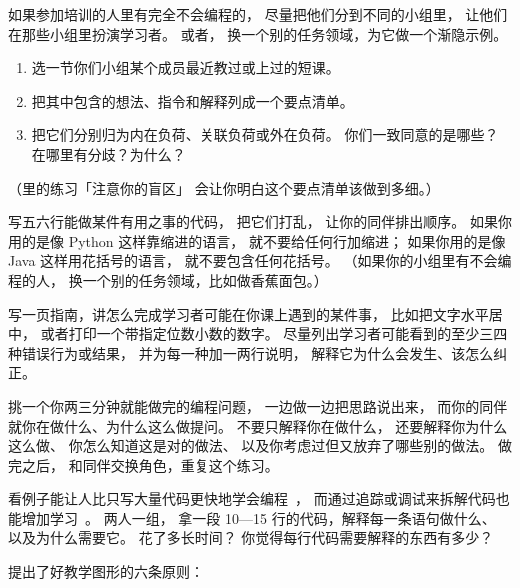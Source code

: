 如果参加培训的人里有完全不会编程的，
尽量把他们分到不同的小组里，
让他们在那些小组里扮演学习者。
或者，
换一个别的任务领域，为它做一个渐隐示例。


\begin{enumerate}

\item
  选一节你们小组某个成员最近教过或上过的短课。

\item
  把其中包含的想法、指令和解释列成一个要点清单。

\item
  把它们分别归为内在负荷、关联负荷或外在负荷。
  你们一致同意的是哪些？
  在哪里有分歧？为什么？

\end{enumerate}

（里的练习「注意你的盲区」
会让你明白这个要点清单该做到多细。）


写五六行能做某件有用之事的代码，
把它们打乱，
让你的同伴排出顺序。
如果你用的是像 Python 这样靠缩进的语言，
就不要给任何行加缩进；
如果你用的是像 Java 这样用花括号的语言，
就不要包含任何花括号。
（如果你的小组里有不会编程的人，
换一个别的任务领域，比如做香蕉面包。）


写一页指南，讲怎么完成学习者可能在你课上遇到的某件事，
比如把文字水平居中，
或者打印一个带指定位数小数的数字。
尽量列出学习者可能看到的至少三四种错误行为或结果，
并为每一种加一两行说明，
解释它为什么会发生、该怎么纠正。


挑一个你两三分钟就能做完的编程问题，
一边做一边把思路说出来，
而你的同伴就你在做什么、为什么这么做提问。
不要只解释你在做什么，
还要解释你为什么这么做、
你怎么知道这是对的做法、
以及你考虑过但又放弃了哪些别的做法。
做完之后，
和同伴交换角色，重复这个练习。


看例子能让人比只写大量代码更快地学会编程~\cite{Skud2014}，
而通过追踪或调试来拆解代码也能增加学习~\cite{Grif2016}。
两人一组，
拿一段 10—15 行的代码，解释每一条语句做什么、
以及为什么需要它。
花了多长时间？
你觉得每行代码需要解释的东西有多少？


\cite{Maye2009,Mill2016a}提出了好教学图形的六条原则：

